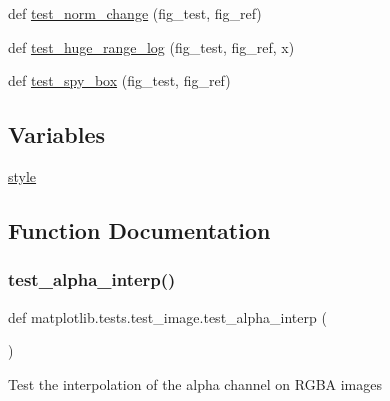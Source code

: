 \begin{DoxyCompactItemize}
\item 
def \hyperlink{namespacematplotlib_1_1tests_1_1test__image_a1cbff512ccbbc9d0b5c5b1cd5c8a8eed}{test\+\_\+norm\+\_\+change} (fig\+\_\+test, fig\+\_\+ref)
\item 
def \hyperlink{namespacematplotlib_1_1tests_1_1test__image_afcb624a4c36749e3e2f27aeff3e949c8}{test\+\_\+huge\+\_\+range\+\_\+log} (fig\+\_\+test, fig\+\_\+ref, x)
\item 
def \hyperlink{namespacematplotlib_1_1tests_1_1test__image_ab997e93aca408d4c2d1ab5d421da8784}{test\+\_\+spy\+\_\+box} (fig\+\_\+test, fig\+\_\+ref)
\end{DoxyCompactItemize}
\subsection*{Variables}
\begin{DoxyCompactItemize}
\item 
\hyperlink{namespacematplotlib_1_1tests_1_1test__image_ad05c17a3dbf1698ab223028e53058582}{style}
\end{DoxyCompactItemize}


\subsection{Function Documentation}
\mbox{\label{namespacematplotlib_1_1tests_1_1test__image_ac94c657d66fa0e358f8bed5ed82e867d}} 
\subsubsection{\texorpdfstring{test\+\_\+alpha\+\_\+interp()}{test\_alpha\_interp()}}
{\footnotesize\ttfamily def matplotlib.\+tests.\+test\+\_\+image.\+test\+\_\+alpha\+\_\+interp (\begin{DoxyParamCaption}{ }\end{DoxyParamCaption})}

\begin{DoxyVerb}Test the interpolation of the alpha channel on RGBA images\end{DoxyVerb}
 \mbox{\label{namespacematplotlib_1_1tests_1_1test__image_a133c8e3f50163bece7bd7b0d7d09b656}} 
